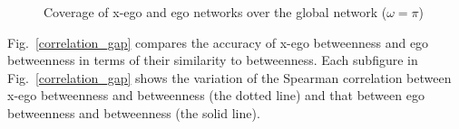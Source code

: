 \begin{figure}[t] 
\centering 
{}
\caption{Coverage of x-ego and ego networks over the global network ($\omega=\pi$)}    
\label{netinfo2}
\end{figure}
Fig.~\ref{correlation_gap} compares the accuracy of x-ego betweenness and ego betweenness in terms of their similarity to betweenness.
Each subfigure in Fig.~\ref{correlation_gap} shows the variation of the Spearman correlation between x-ego betweenness and betweenness (the dotted line) and that between ego betweenness and betweenness (the solid line).
